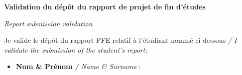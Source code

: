 %
%
\clearpage
\thispagestyle{empty}
\sffamily
\vspace*{0.8cm}

\begin{center}
  {\Large\bfseries
   Validation du dépôt du rapport de projet de fin d'études\par}
  \vspace{5pt}
  {\large\itshape Report submission validation\par}
\end{center}

\vspace{1.0cm}

\noindent
Je valide le dépôt du rapport PFE relatif à l'étudiant nommé ci-dessous
\textit{/ I validate the submission of the student's report:}

\vspace{0.5cm}

\begin{itemize}[label=\textbullet,leftmargin=1.4cm,itemsep=0pt,topsep=0pt]
  \item \textbf{Nom \& Prénom} \textit{/ Name \& Surname} :
        \etudiantComplet
\end{itemize}

\vspace{1.1cm}

